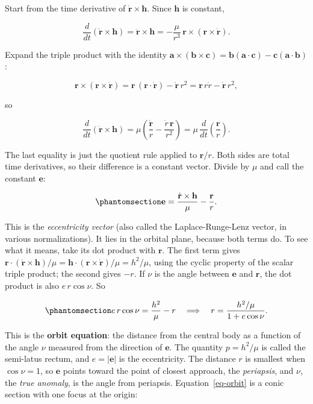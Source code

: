 \documentclass[
  10.5pt,
  letterpaper,
]{scrbook}
\theoremstyle{definition}
\theoremstyle{plain}
\theoremstyle{remark}
\begin{document}
Start from the time derivative of \(\dot{\mathbf{r}}\times\mathbf{h}\).
Since \(\mathbf{h}\) is constant,

\[
\frac{d}{dt}\left(\dot{\mathbf{r}}\times\mathbf{h}\right) = \ddot{\mathbf{r}}\times\mathbf{h}
= -\frac{\mu}{r^3}\,\mathbf{r}\times(\mathbf{r}\times\dot{\mathbf{r}}).
\]

Expand the triple product with the identity
\(\mathbf{a}\times(\mathbf{b}\times\mathbf{c}) = \mathbf{b}(\mathbf{a}\cdot\mathbf{c}) - \mathbf{c}(\mathbf{a}\cdot\mathbf{b})\):

\[
\mathbf{r}\times(\mathbf{r}\times\dot{\mathbf{r}}) = \mathbf{r}\,(\mathbf{r}\cdot\dot{\mathbf{r}}) - \dot{\mathbf{r}}\,r^2
= \mathbf{r}\,r\dot{r} - \dot{\mathbf{r}}\,r^2,
\]

so

\[
\frac{d}{dt}\left(\dot{\mathbf{r}}\times\mathbf{h}\right)
= \mu\left(\frac{\dot{\mathbf{r}}}{r} - \frac{\dot{r}\,\mathbf{r}}{r^2}\right)
= \mu\,\frac{d}{dt}\left(\frac{\mathbf{r}}{r}\right).
\]

The last equality is just the quotient rule applied to \(\mathbf{r}/r\).
Both sides are total time derivatives, so their difference is a constant
vector. Divide by \(\mu\) and call the constant \(\mathbf{e}\):

\begin{equation}\protect\phantomsection\label{eq-ecc-vector}{
\mathbf{e} = \frac{\dot{\mathbf{r}}\times\mathbf{h}}{\mu} - \frac{\mathbf{r}}{r}.
}\end{equation}

This is the \emph{eccentricity vector} (also called the
Laplace-Runge-Lenz vector, in various normalizations). It lies in the
orbital plane, because both terms do. To see what it means, take its dot
product with \(\mathbf{r}\). The first term gives
\(\mathbf{r}\cdot(\dot{\mathbf{r}}\times\mathbf{h})/\mu = \mathbf{h}\cdot(\mathbf{r}\times\dot{\mathbf{r}})/\mu = h^2/\mu\),
using the cyclic property of the scalar triple product; the second gives
\(-r\). If \(\nu\) is the angle between \(\mathbf{e}\) and
\(\mathbf{r}\), the dot product is also \(e\,r\cos\nu\). So

\begin{equation}\protect\phantomsection\label{eq-orbit}{
e\,r\cos\nu = \frac{h^2}{\mu} - r
\quad\Longrightarrow\quad
r = \frac{h^2/\mu}{1 + e\cos\nu}.
}\end{equation}

This is the \textbf{orbit equation}: the distance from the central body
as a function of the angle \(\nu\) measured from the direction of
\(\mathbf{e}\). The quantity \(p = h^2/\mu\) is called the semi-latus
rectum, and \(e = |\mathbf{e}|\) is the eccentricity. The distance \(r\)
is smallest when \(\cos\nu = 1\), so \(\mathbf{e}\) points toward the
point of closest approach, the \emph{periapsis}, and \(\nu\), the
\emph{true anomaly}, is the angle from periapsis.
Equation~\ref{eq-orbit} is a conic section with one focus at the origin:
\end{document}
